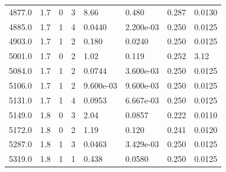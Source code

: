 \documentclass[preview]{standalone}
\begin{document}
{{{\begin{tabular}{L{1.2cm}C{1.2cm} C{0.3cm}C{0.5cm} C{1.4cm}C{1.4cm} C{1.4cm}C{1.4cm}}
  4877.0  &   1.7  & 0     &  3 &  8.66  & 0.480  & 0.287 &  0.0130   \\ 
  4885.0  &   1.7  & 1     &  4 &  0.0440  & 2.200e-03  & 0.250 &  0.0125   \\ 
  4903.0  &   1.7  & 1     &  2 &  0.180  & 0.0240  & 0.250 &  0.0125   \\ 
  5001.0  &   1.7  & 0     &  2 &  1.02  & 0.119  & 0.252 &  3.12   \\ 
  5084.0  &   1.7  & 1     &  2 &  0.0744  & 3.600e-03  & 0.250 &  0.0125   \\ 
  5106.0  &   1.7  & 1     &  2 &  9.600e-03  & 9.600e-03  & 0.250 &  0.0125   \\ 
  5131.0  &   1.7  & 1     &  4 &  0.0953  & 6.667e-03  & 0.250 &  0.0125   \\ 
  5149.0  &   1.8  & 0     &  3 &  2.04  & 0.0857  & 0.222 &  0.0110   \\ 
  5172.0  &   1.8  & 0     &  2 &  1.19  & 0.120  & 0.241 &  0.0120   \\ 
  5287.0  &   1.8  & 1     &  3 &  0.0463  & 3.429e-03  & 0.250 &  0.0125   \\ 
  5319.0  &   1.8  & 1     &  1 &  0.438  & 0.0580  & 0.250 &  0.0125   \\ 
\hline 
\end{tabular} 

}}}
\end{document}
